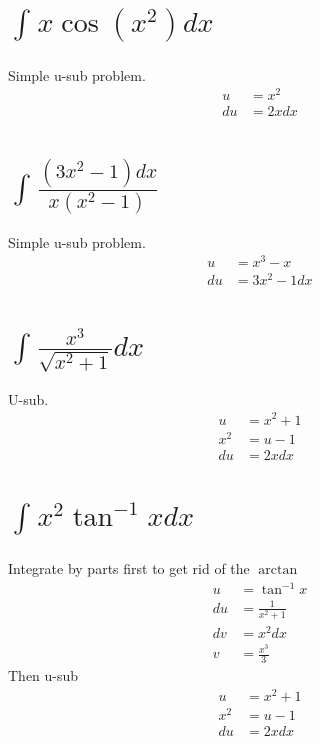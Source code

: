\documentclass[letterpaper, 12pt]{article}
\begin{document}
\section{$
      \int_{ }^{ }x\cos\left(x^{2}\right)dx
  $}
Simple u-sub problem.
\begin{align}
    u  & =x^{2} \\
    du & =2xdx
\end{align}
\setcounter{equation}{0}
\section{$
      \int_{ }^{ }\frac{\left(3x^{2}-1\right)dx}{x\left(x^{2}-1\right)}
  $}
Simple u-sub problem.
\begin{align}
    u  & =x^{3}-x    \\
    du & =3x^{2}-1dx
\end{align}
\setcounter{equation}{0}
\section{$
      \int_{ }^{ }\frac{x^{3}}{\sqrt{x^{2}+1}}dx
  $}
U-sub.
\begin{align}
    u     & =x^{2}+1 \\
    x^{2} & =u-1     \\
    du    & =2xdx
\end{align}
\setcounter{equation}{0}
\section{$
    \int_{ }^{ }x^{2}\tan^{-1}xdx
$}
Integrate by parts first to get rid of the $\arctan$
\begin{align}
    u  & =\tan^{-1}x        \\
    du & =\frac{1}{x^{2}+1} \\
    dv & =x^{2}dx           \\
    v  & =\frac{x^{3}}{3}
\end{align}
Then u-sub
\begin{align}
    u     & =x^{2}+1 \\
    x^{2} & =u-1     \\
    du    & =2xdx
\end{align}
\end{document}

